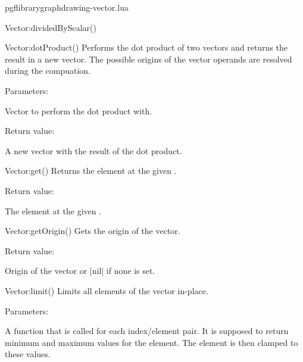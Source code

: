 \begin{filedescription}{pgflibrarygraphdrawing-vector.lua}
\begin{luacommand}{{Vector:dividedByScalar}()}
\end{luacommand}
\begin{luacommand}{{Vector:dotProduct}()}
Performs the dot product of two vectors and returns the result in a new vector.  The possible origins of the vector operands are resolved during the compuation. 

Parameters:
\begin{parameterdescription}
	\item[\meta{other}] Vector to perform the dot product with. 
\end{parameterdescription}


Return value:
\begin{parameterdescription} 
  \item[] A new vector with the result of the dot product. 
\end{parameterdescription}


\end{luacommand}
\begin{luacommand}{{Vector:get}()}
Returns the element at the given . 


Return value:
\begin{parameterdescription} 
  \item[] The element at the given . 
\end{parameterdescription}


\end{luacommand}
\begin{luacommand}{{Vector:getOrigin}()}
Gets the origin of the vector. 


Return value:
\begin{parameterdescription} 
  \item[] Origin of the vector or |nil| if none is set. 
\end{parameterdescription}


\end{luacommand}
\begin{luacommand}{{Vector:limit}()}
Limits all elements of the vector in-place. 

Parameters:
\begin{parameterdescription}
	\item[\meta{limit\_function}] A function that is called for each index/element pair. It is supposed to return minimum and maximum values for the element. The element is then clamped to these values. 
\end{parameterdescription}




\end{luacommand}
\end{filedescription}
